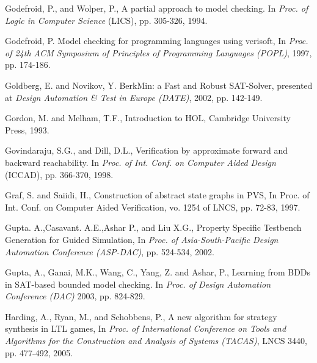 {\begin{thebibliography}{99}

 Godefroid, P., and Wolper, P., A partial approach to
	model checking. In {\em Proc. of Logic in Computer Science} (LICS),
	pp. 305-326, 1994.

 Godefroid, P. Model checking for programming 
	languages using verisoft, In {\em Proc. of 24th ACM Symposium of 
	Principles of Programming Languages (POPL)}, 1997, pp. 174-186.

 Goldberg, E. and Novikov, Y.  BerkMin: a Fast and Robust
        SAT-Solver, presented at {\em Design Automation \& Test in Europe
        (DATE)}, 2002, pp. 142-149.

 Gordon, M. and Melham, T.F., Introduction to HOL, 
	Cambridge University Press, 1993.

 Govindaraju, S.G., and Dill, D.L., Verification by
	approximate forward and backward reachability. In {\em Proc. of
	Int. Conf. on Computer Aided Design} (ICCAD), pp. 366-370, 1998.

 Graf, S. and Saiidi, H., Construction of abstract state 
	graphs in PVS, In Proc. of Int. Conf. on Computer Aided Verification, 
	vo. 1254 of LNCS, pp. 72-83, 1997. 


 Gupta. A.,Casavant. A.E.,Ashar P., and Liu X.G.,
        Property Specific Testbench Generation for Guided Simulation,
        In {\em Proc. of Asia-South-Pacific Design Automation Conference
        (ASP-DAC)}, pp. 524-534, 2002.

 Gupta, A., Ganai, M.K., Wang, C., Yang, Z. and Ashar, P.,
	Learning from BDDs in SAT-based bounded model 
	checking. In {\em Proc. of Design Automation Conference (DAC)}
    2003, pp. 824-829.

 Harding, A., Ryan, M., and Schobbens, P., 
	A new algorithm for strategy synthesis in LTL games, In 
	{\em Proc. of International Conference on Tools and Algorithms for the
        Construction and Analysis of Systems (TACAS)}, 
	LNCS 3440, pp. 477-492, 2005.


\end{thebibliography}}

